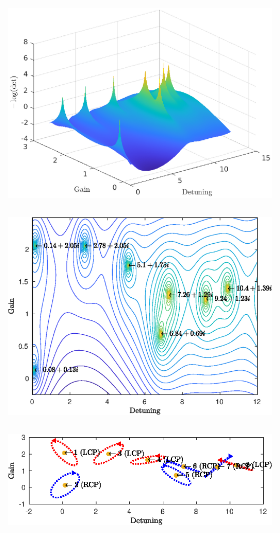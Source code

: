 \begin{figure}
	\centering
	\begin{subfigure}{0.49\textwidth}
		\begin{subfigure}{\textwidth}
			\includegraphics[width=\textwidth]{plots/defect/surface_oseen}
			\caption{}
			\label{fig:defect_cavity:oseen_surf}
		\end{subfigure}
		\begin{subfigure}{\textwidth}
			\includegraphics[width=\textwidth]{plots/defect/contour_oseen}
			\caption{}
			\label{fig:defect_cavity:oseen_contour}
		\end{subfigure}
		\begin{subfigure}{\textwidth}
			\includegraphics[width=\textwidth]{plots/defect/modes_found}

\end{subfigure}
\end{subfigure}
\end{figure}
